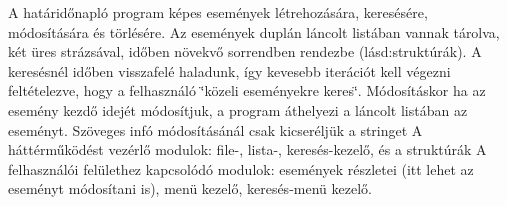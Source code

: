 A határidőnapló program képes események létrehozására, keresésére, módosítására és törlésére. Az események duplán láncolt listában vannak tárolva, két üres strázsával, időben növekvő sorrendben rendezbe (lásd\+:struktúrák). A keresésnél időben visszafelé haladunk, így kevesebb iterációt kell végezni feltételezve, hogy a felhasználó \char`\"{}közeli eseményekre keres\char`\"{}. Módosításkor ha az esemény kezdő idejét módosítjuk, a program áthelyezi a láncolt listában az eseményt. Szöveges infó módosításánál csak kicseréljük a stringet A háttérműködést vezérlő modulok\+: file-\/, lista-\/, keresés-\/kezelő, és a struktúrák A felhasználói felülethez kapcsolódó modulok\+: események részletei (itt lehet az eseményt módosítani is), menü kezelő, keresés-\/menü kezelő. 